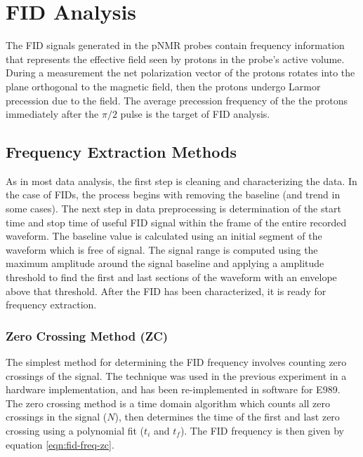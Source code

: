 \chapter{FID Analysis} \label{ch:fid-analysis}

The FID signals generated in the pNMR probes contain frequency information that represents the effective field seen by protons in the probe's active volume.  During a measurement the net polarization vector of the protons rotates into the plane orthogonal to the magnetic field, then the protons undergo Larmor precession due to the field.  The average precession frequency of the the protons immediately after the $\pi/2$ pulse is the target of FID analysis.

\section{Frequency Extraction Methods}

As in most data analysis, the first step is cleaning and characterizing the data.  In the case of FIDs, the process begins with removing the baseline (and trend in some cases).  The next step in data preprocessing is determination of the start time and stop time of useful FID signal within the frame of the entire recorded waveform.  The baseline value is calculated using an initial segment of the waveform which is free of signal.  The signal range is computed using the maximum amplitude around the signal baseline and applying a amplitude threshold to find the first and last sections of the waveform with an envelope above that threshold.  After the FID has been characterized, it is ready for frequency extraction.


\subsection{Zero Crossing Method (ZC)}
The simplest method for determining the FID frequency involves counting zero crossings of the signal.  The technique was used in the previous \mugmtwo experiment in a hardware implementation, and has been re-implemented in software for E989.  The zero crossing method is a time domain algorithm which counts all zero crossings in the signal ($N$), then determines the time of the first and last zero crossing using a polynomial fit ($t_i$ and $t_f$).  The FID frequency is then given by equation \ref{eqn:fid-freq-zc}.

